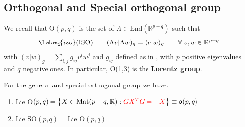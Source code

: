 \documentclass[../main.tex]{subfiles}
\begin{document}
\subsection{Orthogonal and Special orthogonal group}
We recall that O$(p,q)$ is the set of $\Lambda\in\textrm{End}(\mathbb{R}^{p+q})$ such that \begin{equation}\labeq{iso}
(\textrm{ISO}) \qquad (\Lambda v|\Lambda w)_g=(v|w)_g \qquad \forall\; v,w\in\mathbb{R}^{p+q}
\end{equation}
with $(v|w)_g=\sum_{i,j}g_{ij}v^iw^j$ and $g_{ij}$ defined as in , with $p$ positive eigenvalues and $q$ negative ones. In particular, O(1,3) is the \textbf{Lorentz group}.\marginnote{
\[
G=\mqty(\dmat{-1,\ddots,-1,+1,\ddots,+1})
\]
}
\begin{proposition} For the general and special orthogonal group we have:
\renewcommand{\labelenumi}{\arabic{enumi})}
\begin{enumerate}
\item Lie O$(p,q)=\left\{X\in\text{Mat}(p+q,\mathbb{R}):{\color{red}GX^TG=-X}\right\}\equiv\mathfrak{o}(p,q)$
\item Lie SO$(p,q)=\textrm{Lie O}(p,q)$
\end{enumerate}
\end{proposition}
\end{document}
